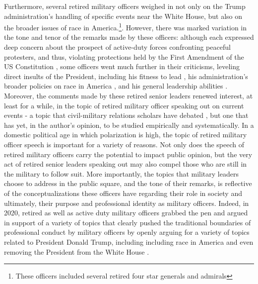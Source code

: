 \documentclass[12pt,]{article}
\begin{document}
Furthermore, several retired military officers weighed in not only on the Trump administration's handling of specific events near the White House, but also on the broader issues of race in America.\footnote{These officers included several retired four star generals and admirals}. However, there was marked variation in the tone and tenor of the remarks made by these officers: although each expressed deep concern about the prospect of active-duty forces confronting peaceful protesters, and thus, violating protections held by the First Amendment of the US Constitution \autocites{brooks_dismay_2020}{dempsey_former_2020}, some officers went much further in their criticisms, leveling direct insults of the President, including his fitness to lead \autocite{goldberg_james_2020}, his administration's broader policies on race in America \autocite{allen_moment_2020}, and his general leadership abilities \autocite{mullen_i_2020}. Moreover, the comments made by these retired senior leaders renewed interest, at least for a while, in the topic of retired military officer speaking out on current events - a topic that civil-military relations scholars have debated \autocites{kagan_let_2006}{brooks_let_2020}, but one that has yet, in the author's opinion, to be studied empirically and systematically. In a domestic political age in which polarization is high, the topic of retired military officer speech is important for a variety of reasons. Not only does the speech of retired military officers carry the potential to impact public opinion, but the very act of retired senior leaders speaking out may also compel those who are still in the military to follow suit. More importantly, the topics that military leaders choose to address in the public square, and the tone of their remarks, is reflective of the conceptualizations these officers have regarding their role in society and ultimately, their purpose and professional identity as military officers. Indeed, in 2020, retired as well as active duty military officers grabbed the pen and argued in support of a variety of topics that clearly pushed the traditional boundaries of professional conduct by military officers by openly arguing for a variety of topics related to President Donald Trump, including including race in America \autocite{askew_anti-racist_2020} and even removing the President from the White House \autocite{nagl__2020}.
\end{document}
